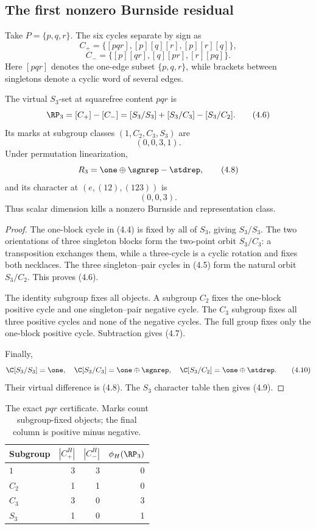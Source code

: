 \subsection{The first nonzero Burnside residual}

Take $P=\{p,q,r\}$.  The six cycles separate by sign as
\[
 C_+=\{[pqr],[p][q][r],[p][r][q]\},
 \tag{4.4}
\]
\[
 C_-=\{[p][qr],[q][pr],[r][pq]\}.
 \tag{4.5}
\]
Here $[pqr]$ denotes the one-edge subset $\{p,q,r\}$, while brackets between
singletons denote a cyclic word of several edges.

\begin{theorem}
\label{thm:pqr}
The virtual $S_3$-set at squarefree content $pqr$ is
\[
  \RP_3=[C_+]-[C_-]
  =[S_3/S_3]+[S_3/C_3]-[S_3/C_2].
  \tag{4.6}
\]
Its marks at subgroup classes $(1,C_2,C_3,S_3)$ are
\[
  (0,0,3,1).
  \tag{4.7}
\]
Under permutation linearization,
\[
  R_3=\one\oplus\sgnrep-\stdrep,
  \tag{4.8}
\]
and its character at $(e,(12),(123))$ is
\[
  (0,0,3).
  \tag{4.9}
\]
Thus scalar dimension kills a nonzero Burnside and representation class.
\end{theorem}

\begin{proof}
The one-block cycle in (4.4) is fixed by all of $S_3$, giving $S_3/S_3$.
The two orientations of three singleton blocks form the two-point orbit
$S_3/C_3$: a transposition exchanges them, while a three-cycle is a cyclic
rotation and fixes both necklaces.  The three singleton--pair cycles in
(4.5) form the natural orbit $S_3/C_2$.  This proves (4.6).

The identity subgroup fixes all objects.  A subgroup $C_2$ fixes the
one-block positive cycle and one singleton--pair negative cycle.  The $C_3$
subgroup fixes all three positive cycles and none of the negative cycles.
The full group fixes only the one-block positive cycle.  Subtraction gives
(4.7).

Finally,
\[
 \C[S_3/S_3]=\one,
 \quad \C[S_3/C_3]=\one\oplus\sgnrep,
 \quad \C[S_3/C_2]=\one\oplus\stdrep.
 \tag{4.10}
\]
Their virtual difference is (4.8).  The $S_3$ character table then gives
(4.9).
\end{proof}

\begin{table}[t]
\centering
\caption{The exact $pqr$ certificate.  Marks count subgroup-fixed objects;
the final column is positive minus negative.}
\label{tab:pqr-marks}
\begin{tabular}{lrrr}
\toprule
Subgroup & $|C_+^H|$ & $|C_-^H|$ & $\phi_H(\RP_3)$\\
\midrule
$1$ & 3 & 3 & 0\\
$C_2$ & 1 & 1 & 0\\
$C_3$ & 3 & 0 & 3\\
$S_3$ & 1 & 0 & 1\\
\bottomrule
\end{tabular}
\end{table}

